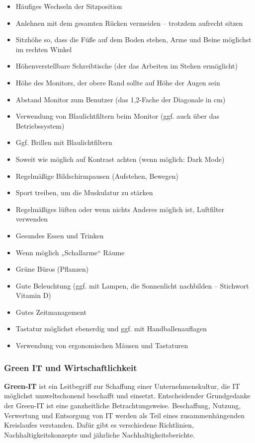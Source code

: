 \documentclass[10pt]{article}
\begin{document}
\begin{flushleft}
\begin{itemize}
    \item Häufiges Wechseln der Sitzposition
    \item Anlehnen mit dem gesamten Rücken vermeiden – trotzdem aufrecht sitzen
    \item Sitzhöhe so, dass die Füße auf dem Boden stehen, Arme und Beine möglichst im rechten Winkel
    \item Höhenverstellbare Schreibtische (der das Arbeiten im Stehen ermöglicht)
    \item Höhe des Monitors, der obere Rand sollte auf Höhe der Augen sein
    \item Abstand Monitor zum Benutzer (das 1,2-Fache der Diagonale in cm)
    \item Verwendung von Blaulichtfiltern beim Monitor (ggf. auch über das Betriebssystem)
    \item Ggf. Brillen mit Blaulichtfiltern
    \item Soweit wie möglich auf Kontrast achten (wenn möglich: Dark Mode)
    \item Regelmäßige Bildschirmpausen (Aufstehen, Bewegen)
    \item Sport treiben, um die Muskulatur zu stärken
    \item Regelmäßiges lüften oder wenn nichts Anderes möglich ist, Luftfilter verwenden
    \item Gesundes Essen und Trinken
    \item Wenn möglich „Schallarme“ Räume
    \item Grüne Büros (Pflanzen)
    \item Gute Beleuchtung (ggf. mit Lampen, die Sonnenlicht nachbilden – Stichwort Vitamin D)
    \item Gutes Zeitmanagement
    \item Tastatur möglichst ebenerdig und ggf. mit Handballenauflagen
    \item Verwendung von ergonomischen Mäusen und Tastaturen
\end{itemize}

\subsubsection{Green IT und Wirtschaftlichkeit}

\textbf{Green-IT} ist ein Leitbegriff zur Schaffung einer Unternehmenskultur, die IT möglichst umweltschonend beschafft und einsetzt. Entscheidender Grundgedanke der Green-IT ist eine ganzheitliche Betrachtungsweise. Beschaffung, Nutzung, Verwertung und Entsorgung von IT werden als Teil eines zusammenhängenden Kreislaufes verstanden.
Dafür gibt es verschiedene Richtlinien, Nachhaltigkeitskonzepte und jährliche Nachhaltigkeitsberichte.


\end{flushleft}
\end{document}
